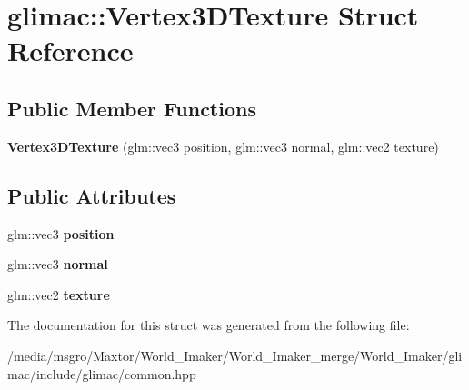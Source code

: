 \hypertarget{structglimac_1_1Vertex3DTexture}{}\section{glimac\+:\+:Vertex3\+D\+Texture Struct Reference}
\label{structglimac_1_1Vertex3DTexture}
\subsection*{Public Member Functions}
\begin{DoxyCompactItemize}
\item 
\mbox{\label{structglimac_1_1Vertex3DTexture_ac461f0825c04dd162e732cdcf61bce8b}} 
{\bfseries Vertex3\+D\+Texture} (glm\+::vec3 position, glm\+::vec3 normal, glm\+::vec2 texture)
\end{DoxyCompactItemize}
\subsection*{Public Attributes}
\begin{DoxyCompactItemize}
\item 
\mbox{\label{structglimac_1_1Vertex3DTexture_ac14c3d140276a6e99414c73c10f501b5}} 
glm\+::vec3 {\bfseries position}
\item 
\mbox{\label{structglimac_1_1Vertex3DTexture_af96395447e991b64d3871618b60b7e41}} 
glm\+::vec3 {\bfseries normal}
\item 
\mbox{\label{structglimac_1_1Vertex3DTexture_a7dc16eb566e2fb5cac456f001449faa0}} 
glm\+::vec2 {\bfseries texture}
\end{DoxyCompactItemize}


The documentation for this struct was generated from the following file\+:\begin{DoxyCompactItemize}
\item 
/media/msgro/\+Maxtor/\+World\+\_\+\+Imaker/\+World\+\_\+\+Imaker\+\_\+merge/\+World\+\_\+\+Imaker/glimac/include/glimac/common.\+hpp\end{DoxyCompactItemize}
